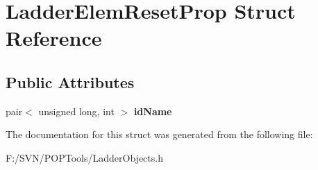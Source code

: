 \hypertarget{struct_ladder_elem_reset_prop}{\section{Ladder\-Elem\-Reset\-Prop Struct Reference}
\label{struct_ladder_elem_reset_prop}
}
\subsection*{Public Attributes}
\begin{DoxyCompactItemize}
\item 
\hypertarget{struct_ladder_elem_reset_prop_a5fc14d089db2fec63f771623e9d9b240}{pair$<$ unsigned long, int $>$ {\bfseries id\-Name}}\label{struct_ladder_elem_reset_prop_a5fc14d089db2fec63f771623e9d9b240}

\end{DoxyCompactItemize}


The documentation for this struct was generated from the following file\-:\begin{DoxyCompactItemize}
\item 
F\-:/\-S\-V\-N/\-P\-O\-P\-Tools/Ladder\-Objects.\-h\end{DoxyCompactItemize}
